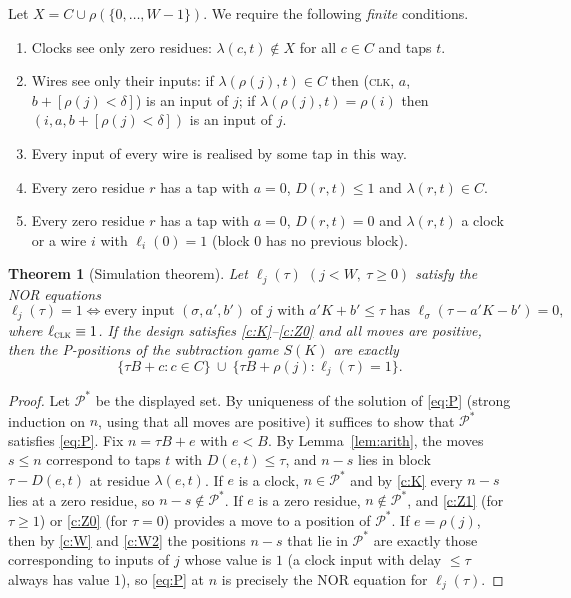 \documentclass[11pt]{article}
\newtheorem{theorem}{Theorem}
\theoremstyle{definition}
\newcommand{\cP}{\mathcal{P}}
\begin{document}
Let $X=C\cup\rho(\{0,\dots,W-1\})$.  We require the following \emph{finite} conditions.
\begin{enumerate}[label=(\textbf{\Alph*})]
\item\label{c:K} Clocks see only zero residues: $\lambda(c,t)\notin X$ for all $c\in C$ and taps $t$.
\item\label{c:W} Wires see only their inputs: if $\lambda(\rho(j),t)\in C$ then (\textsc{clk}, $a$,
$b+[\rho(j)<\delta]$) is an input of $j$; if $\lambda(\rho(j),t)=\rho(i)$ then $(i,a,b+[\rho(j)<\delta])$ is
an input of $j$.
\item\label{c:W2} Every input of every wire is realised by some tap in this way.
\item\label{c:Z1} Every zero residue $r$ has a tap with $a=0$, $D(r,t)\le 1$ and $\lambda(r,t)\in C$.
\item\label{c:Z0} Every zero residue $r$ has a tap with $a=0$, $D(r,t)=0$ and $\lambda(r,t)$ a clock or a
wire $i$ with $\ell_i(0)=1$ (block $0$ has no previous block).
\end{enumerate}

\begin{theorem}[Simulation theorem]\label{thm:sim}
Let $\ell_j(\tau)$ $(j<W,\ \tau\ge 0)$ satisfy the NOR equations
\[\ell_j(\tau)=1\iff \text{every input }(\sigma,a',b')\text{ of }j\text{ with }a'K+b'\le\tau
\text{ has }\ell_\sigma(\tau-a'K-b')=0,\]
where $\ell_{\textsc{clk}}\equiv 1$.  If the design satisfies \ref{c:K}--\ref{c:Z0} and all moves
are positive, then the P-positions of the subtraction game $S(K)$ are exactly
\[\{\tau B+c: c\in C\}\ \cup\ \{\tau B+\rho(j): \ell_j(\tau)=1\}.\]
\end{theorem}

\begin{proof}
Let $\cP^*$ be the displayed set.  By uniqueness of the solution of \eqref{eq:P} (strong induction
on $n$, using that all moves are positive) it suffices to show that $\cP^*$ satisfies \eqref{eq:P}.
Fix $n=\tau B+e$ with $e<B$.  By Lemma~\ref{lem:arith}, the moves $s\le n$ correspond to taps $t$ with
$D(e,t)\le\tau$, and $n-s$ lies in block $\tau-D(e,t)$ at residue $\lambda(e,t)$.
If $e$ is a clock, $n\in\cP^*$ and by \ref{c:K} every $n-s$ lies at a zero residue, so
$n-s\notin\cP^*$.  If $e$ is a zero residue, $n\notin\cP^*$, and \ref{c:Z1} (for $\tau\ge1$) or
\ref{c:Z0} (for $\tau=0$) provides a move to a position of $\cP^*$.  If $e=\rho(j)$, then by
\ref{c:W} and \ref{c:W2} the positions $n-s$ that lie in $\cP^*$ are exactly those corresponding to
inputs of $j$ whose value is $1$ (a clock input with delay $\le \tau$ always has value $1$), so
\eqref{eq:P} at $n$ is precisely the NOR equation for $\ell_j(\tau)$.
\end{proof}
\end{document}
